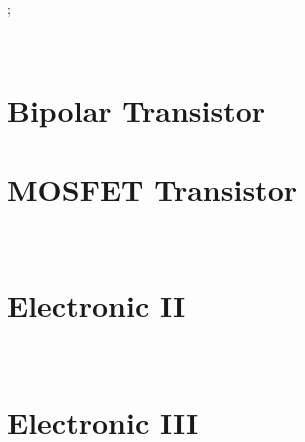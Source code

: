 \documentclass{article}
\numberwithin{equation}{section}%
\begin{document}


\pagecolor{mainTheme}\afterpage{\pagecolor{backCirc}}
\maketitle
\thispagestyle{empty}


\newcommand{\TonDdef}[1]{
\renewcommand{\Places}{#1} %
}

\newcommand{\myfrac}[3][3pt]{\frac{\raisebox{10pt}{#2}}{\raisebox{-10pt}{#3}}};

\newpage
\TonDdef{Common Emiiter} %
~\vspace{-1em}
\section{Bipolar Transistor}




\newpage
\TonDdef{Common Base} %




\newpage
\TonDdef{Common Collector}


\newpage
\section{MOSFET Transistor}
\TonDdef{Mosfet Basics} %


\newpage
\TonDdef{Common Source} %



\newpage
\TonDdef{Common Gate} %



\newpage
\TonDdef{Common Drain} %


\newpage
\TonDdef{Electronic II} %
~\vspace{-1em}
\section{Electronic II}


\TonDdef{Differential Pair} %


\newpage
\TonDdef{Electronic III} %
~\vspace{-1em}
\section{Electronic III}


\end{document}
